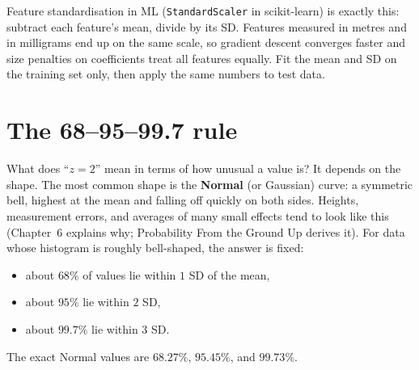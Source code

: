 \begin{connectionbox}
Feature standardisation in ML (\texttt{StandardScaler} in scikit-learn) is
exactly this: subtract each feature's mean, divide by its SD. Features measured in
metres and in milligrams end up on the same scale, so gradient descent converges
faster and size penalties on coefficients treat all features equally. Fit
the mean and SD on the training set only, then apply the same numbers to test data.
\end{connectionbox}

\section{The 68--95--99.7 rule}
\label{sec:center-spread-empirical}

What does ``$z = 2$'' mean in terms of how unusual a value is? It depends on the
shape. The most common shape is the \textbf{Normal} (or Gaussian) curve: a
symmetric bell, highest at the mean and falling off quickly on both sides. Heights,
measurement errors, and averages of many small effects tend to look like this
(Chapter~6 explains why; Probability From the Ground Up derives it). For data whose
histogram is roughly bell-shaped, the answer is fixed:

\begin{itemize}
  \item about $68\%$ of values lie within $1$ SD of the mean,
  \item about $95\%$ lie within $2$ SD,
  \item about $99.7\%$ lie within $3$ SD.
\end{itemize}
The exact Normal values are $68.27\%$, $95.45\%$, and $99.73\%$.

